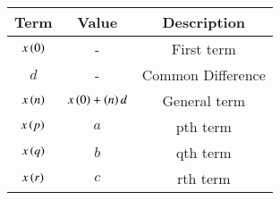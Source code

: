 \begin{tabular}{|c|c|c|}
    \hline
    \textbf{Term} & \textbf{Value} & \textbf{Description}\\
    \hline
    $x\left(0\right)$ & - & First term\\
    \hline
    $d$ & - & Common Difference\\
    \hline
    $x\left(n\right)$ & $x\left(0\right)+\left(n\right)d$ & General term\\
    \hline
    $x\left(p\right)$ & $a$ & pth term\\
    \hline
    $x\left(q\right)$ & $b$ & qth term\\
    \hline
    $x\left(r\right)$ & $c$ & rth term\\
    \hline
  \end{tabular}
  
